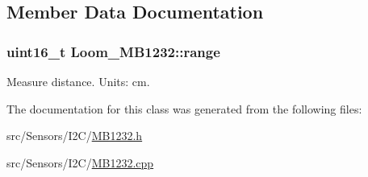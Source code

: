 \subsection{Member Data Documentation}
\subsubsection[{\texorpdfstring{range}{range}}]{\setlength{\rightskip}{0pt plus 5cm}uint16\+\_\+t Loom\+\_\+\+M\+B1232\+::range\hspace{0.3cm}{\ttfamily [protected]}}\hypertarget{class_loom___m_b1232_acfb38d20f72e16e517ed5cc670a4d1a8}{}\label{class_loom___m_b1232_acfb38d20f72e16e517ed5cc670a4d1a8}


Measure distance. Units\+: cm. 



The documentation for this class was generated from the following files\+:\begin{DoxyCompactItemize}
\item 
src/\+Sensors/\+I2\+C/\hyperlink{_m_b1232_8h}{M\+B1232.\+h}\item 
src/\+Sensors/\+I2\+C/\hyperlink{_m_b1232_8cpp}{M\+B1232.\+cpp}\end{DoxyCompactItemize}
